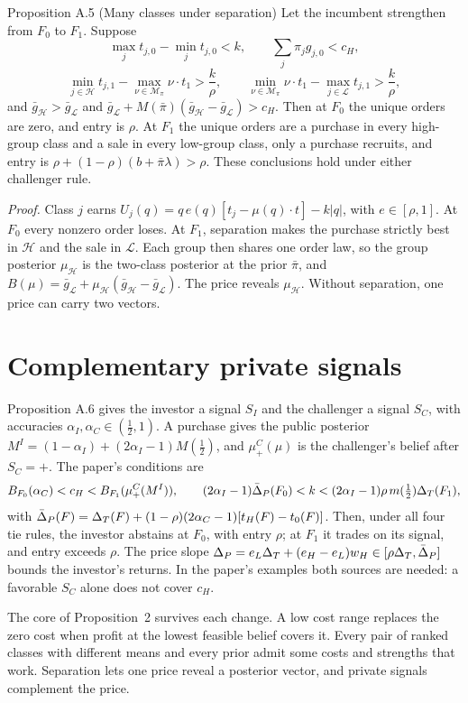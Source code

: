 \begin{paperresult}{Proposition A.5 (Many classes under separation)}
Let the incumbent strengthen from \(F_0\) to \(F_1\). Suppose
\[
\max_jt_{j,0}-\min_jt_{j,0}<k,\qquad \sum_j\pi_jg_{j,0}<c_H,
\]
\[
\min_{j\in\mathcal H}t_{j,1}-\max_{\nu\in\mathcal M_\pi}\nu\cdot t_1>\frac k\rho,\qquad
\min_{\nu\in\mathcal M_\pi}\nu\cdot t_1-\max_{j\in\mathcal L}t_{j,1}>\frac k\rho,
\]
and \(\bar g_{\mathcal H}>\bar g_{\mathcal L}\) and \(\bar g_{\mathcal L}+M(\bar\pi)(\bar g_{\mathcal H}-\bar g_{\mathcal L})>c_H\).
Then at \(F_0\) the unique orders are zero, and entry is \(\rho\). At \(F_1\) the unique orders are a purchase in every high-group class and a sale in every low-group class, only a purchase recruits, and entry is \(\rho+(1-\rho)(b+\bar\pi\lambda)>\rho\). These conclusions hold under either challenger rule.
\end{paperresult}

\emph{Proof.} Class \(j\) earns \(U_j(q)=q\,e(q)[t_j-\mu(q)\cdot t]-k|q|\), with \(e\in[\rho,1]\). At \(F_0\) every
nonzero order loses. At \(F_1\), separation makes the purchase strictly best in \(\mathcal H\) and the sale in
\(\mathcal L\). Each group then shares one order law, so the group posterior \(\mu_{\mathcal H}\) is the two-class
posterior at the prior \(\bar\pi\), and \(B(\mu)=\bar g_{\mathcal L}+\mu_{\mathcal H}(\bar g_{\mathcal H}-\bar g_{\mathcal
L})\). The price reveals \(\mu_{\mathcal H}\). Without separation, one price can carry two vectors.

\section{Complementary private signals}\label{sec:robustness-signals}

Proposition A.6 gives the investor a signal \(S_I\) and the challenger a signal \(S_C\), with accuracies
\(\alpha_I,\alpha_C\in(\tfrac12,1)\). A purchase gives the public posterior \(M^I=(1-\alpha_I)+(2\alpha_I-1)M(\tfrac12)\), and \(\mu^C_+(\mu)\) is the challenger's belief
after \(S_C=+\). The paper's conditions are
\[
B_{F_0}(\alpha_C)<c_H<B_{F_1}(\mu^C_+(M^I)),\qquad
(2\alpha_I-1)\bar\Delta_P(F_0)<k<(2\alpha_I-1)\rho\,m(\tfrac12)\Delta_T(F_1),
\]
with \(\bar\Delta_P(F)=\Delta_T(F)+(1-\rho)(2\alpha_C-1)[t_H(F)-t_0(F)]\). Then, under all four tie rules, the investor
abstains at \(F_0\), with entry \(\rho\); at \(F_1\) it trades on its signal, and entry exceeds \(\rho\).
The price slope \(\Delta_P=e_L\Delta_T+(e_H-e_L)w_H\in[\rho\Delta_T,\bar\Delta_P]\) bounds the investor's returns. In the paper's examples both sources are needed: a favorable \(S_C\) alone does not cover \(c_H\).

\begin{chaptersummary}
The core of Proposition~2 survives each change. A low cost range replaces the zero cost when profit at the lowest
feasible belief covers it. Every pair of ranked classes with different means and every prior admit some costs and strengths that work.
Separation lets one price reveal a posterior vector, and private signals complement the price.
\end{chaptersummary}
